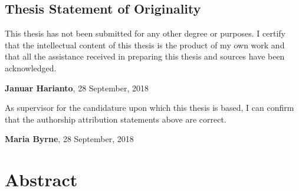\documentclass[
  oneside, 11pt, a4paper]{memoir}
\begin{document}
\vfill
\hrulefill


\section*{Thesis Statement of Originality}

This thesis has not been submitted for any other degree or purposes. I certify that the intellectual content of this thesis is the product of my own work and that all the assistance received in preparing this thesis and sources have been acknowledged.

\vspace{12mm}
\textbf{Januar Harianto}, 28 September, 2018

\vspace{3.14mm}

As supervisor for the candidature upon which this thesis is based, I can confirm that the authorship attribution statements above are correct.

\vspace{12mm}
\textbf{Maria Byrne}, 28 September, 2018




\cleardoublepage

\SingleSpacing

\chapter{Abstract}

\OnehalfSpacing
\end{document}
